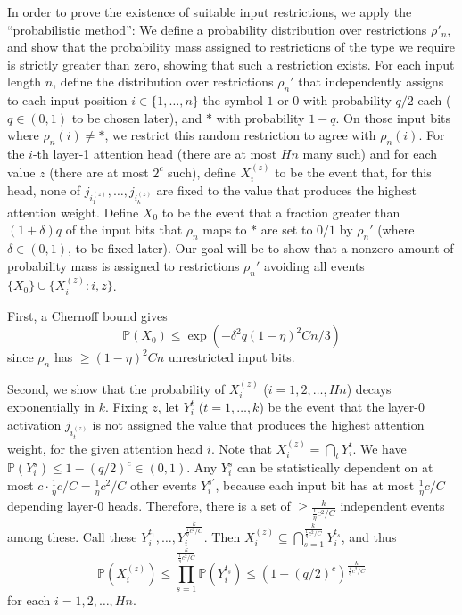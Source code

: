 \documentclass[11pt,a4paper]{article}
\newcommand{\Prob}{\mathbb{P}}%
\begin{document}
In order to prove the existence of suitable input restrictions, we apply the ``probabilistic method'': We define a probability distribution over restrictions $\rho'_n$, and show that the probability mass assigned to restrictions of the type we require is strictly greater than zero, showing that such a restriction exists.
For each input length $n$, define the distribution over restrictions $\rho_n'$ that independently assigns to each input position $i \in \{1, \dots, n\}$ the symbol $1$ or $0$ with probability $q/2$ each ($q \in (0,1)$ to be chosen later), and $*$ with probability $1-q$.
On those input bits where $\rho_n(i) \neq *$, we restrict this random restriction to agree with $\rho_n(i)$.
For the $i$-th layer-1 attention head (there are at most $Hn$ many such) and for each value $z$ (there are at most $2^c$ such), define $X_i^{(z)}$ to be the event that, for this head, none of $j_{i_1^{(z)}}, \dots, j_{i_k^{(z)}}$ are fixed to the value that produces the highest attention weight. %
Define $X_0$ to be the event that a fraction greater than $(1+\delta)q$ of the input bits that $\rho_n$ maps to $*$ are set to $0/1$ by $\rho_n'$ (where $\delta \in (0,1)$, to be fixed later).
Our goal will be to show that a nonzero amount of probability mass is assigned to restrictions $\rho_n'$ avoiding all events $\{X_0\} \cup \{X_i^{(z)} : i, z\}$.

First, a Chernoff bound gives~\cite[Theorem 4.4]{mitzenmacherprobability}
\begin{equation}
\Prob(X_0) \leq    \exp\left(-\delta^2q(1-\eta)^2Cn / 3\right)
\end{equation}
since $\rho_n$ has $\geq (1-\eta)^2Cn$ unrestricted input bits.

Second, we show that the probability of $X_i^{(z)}$ ($i=1,2,\dots, Hn$) decays exponentially in $k$.
Fixing $z$, let $Y_i^t$ ($t=1,\dots,k$) be the event that the layer-0 activation $j_{i_t^{(z)}}$ is not assigned the value that produces the highest attention weight, for the given attention head $i$.
Note that $X_i^{(z)} = \bigcap_t Y_i^t$.
We have $\Prob(Y_i^s) \leq 1-(q/2)^c \in (0,1)$. 
Any $Y_i^s$ can be statistically dependent on at most $c \cdot \frac{1}{\eta}c/C = \frac{1}{\eta}c^2/C$ other events $Y_i^{s'}$, because each input bit has at most $\frac{1}{\eta} c/C$ depending layer-0 heads.
Therefore, there is a set of $\geq \frac{k}{\frac{1}{\eta}c^2/C}$ independent events among these.
Call these $Y_i^{t_1}, \dots, Y_i^{\frac{k}{\frac{1}{\eta}c^2/C}}$.
Then $X_i^{(z)} \subseteq \bigcap_{s=1}^{\frac{k}{\frac{1}{\eta}c^2/C}} Y_i^{t_s}$, and thus
\begin{equation}
\Prob(X_i^{(z)}) \leq \prod_{s=1}^{\frac{k}{\frac{1}{\eta}c^2/C}} \Prob(Y_i^{t_s}) \leq \left(1-(q/2)^c\right)^{\frac{k}{\frac{1}{\eta}c^2/C}}
\end{equation}
for each $i=1, 2, \dots, Hn$.
\end{document}
